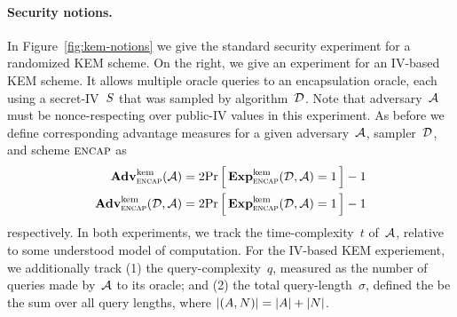 \paragraph{Security notions. }  In Figure~\ref{fig:kem-notions} we give the standard security experiment for a randomized KEM scheme.  On the right, we give an experiment for an IV-based KEM scheme.  It allows multiple oracle queries to an encapsulation oracle, each using a secret-IV~$S$ that was sampled by algorithm~${\cal D}$.  Note that adversary~${\cal A}$ must be nonce-respecting over public-IV values in this experiment.
As before we define corresponding advantage measures for a given adversary~${\cal A}$, sampler~${\cal D}$, and scheme $\textsc{encap}$ as
\begin{align*}
\mathbf{Adv}^{\mathrm{kem}}_{\textsc{encap}}{({\cal A})}&=2{\Pr\left[\,{\mathbf{Exp}^{\mathrm{kem}}_{\textsc{encap}}{({\cal D},{\cal A})}=1}\,\right]}-1\\ \mathbf{Adv}^{\mathrm{kem}}_{\textsc{encap}}{({\cal D},{\cal A})}&=2{\Pr\left[\,{\mathbf{Exp}^{\mathrm{kem}}_{\textsc{encap}}{({\cal D},{\cal A})}=1}\,\right]}-1
\end{align*}
respectively.  In both experiments, we track the time-complexity~$t$ of~${\cal A}$, relative to some understood model of computation.  For the IV-based KEM experiement, we additionally track (1) the query-complexity~$q$, measured as the number of queries made by~${\cal A}$ to its oracle; and (2) the total query-length~$\sigma$, defined the be the sum over all query lengths, where $|(A,N)|=|A|+|N|$.


